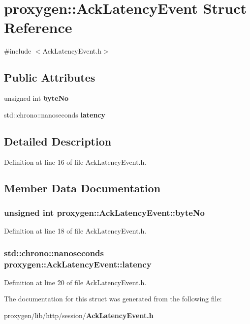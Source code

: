 \section{proxygen\+:\+:Ack\+Latency\+Event Struct Reference}
\label{structproxygen_1_1AckLatencyEvent}


{\ttfamily \#include $<$Ack\+Latency\+Event.\+h$>$}

\subsection*{Public Attributes}
\begin{DoxyCompactItemize}
\item 
unsigned int {\bf byte\+No}
\item 
std\+::chrono\+::nanoseconds {\bf latency}
\end{DoxyCompactItemize}


\subsection{Detailed Description}


Definition at line 16 of file Ack\+Latency\+Event.\+h.



\subsection{Member Data Documentation}
\subsubsection[{byte\+No}]{\setlength{\rightskip}{0pt plus 5cm}unsigned int proxygen\+::\+Ack\+Latency\+Event\+::byte\+No}\label{structproxygen_1_1AckLatencyEvent_a614e7ef0bafbb50ab4c724ab6c29c39a}


Definition at line 18 of file Ack\+Latency\+Event.\+h.

\subsubsection[{latency}]{\setlength{\rightskip}{0pt plus 5cm}std\+::chrono\+::nanoseconds proxygen\+::\+Ack\+Latency\+Event\+::latency}\label{structproxygen_1_1AckLatencyEvent_a05f7213062534e8b13052e946447e1fb}


Definition at line 20 of file Ack\+Latency\+Event.\+h.



The documentation for this struct was generated from the following file\+:\begin{DoxyCompactItemize}
\item 
proxygen/lib/http/session/{\bf Ack\+Latency\+Event.\+h}\end{DoxyCompactItemize}
